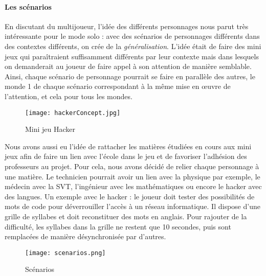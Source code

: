 \newpage
\paragraph{Les scénarios}En discutant du multijoueur, l'idée des différents personnages nous parut très intéressante pour le mode solo : avec des scénarios de personnages différents
dans des contextes différents, on crée de la \emph{généralisation}. L'idée était de faire des mini jeux qui paraîtraient suffisamment différents par leur contexte mais dans lesquels on
demanderait au joueur de faire appel à son attention de manière semblable. Ainsi, chaque scénario de personnage pourrait se faire en parallèle des autres, le monde 1 de chaque scénario
correspondant à la même mise en œuvre de l'attention, et cela pour tous les mondes. 

\begin{wrapfigure}[11]{l}{6cm}
    \vspace{-20pt}
    \begin{center}
    \texttt{[image: hackerConcept.jpg]}
    \end{center}
    \captionsetup{labelformat=simpleNumber}
    \caption{Mini jeu Hacker}
\label{Hacker}
\end{wrapfigure}

Nous avons aussi eu l'idée de rattacher les matières étudiées en cours aux mini jeux afin de faire un lien avec l'école dans le jeu et de favoriser l'adhésion des professeurs au projet.
Pour cela, nous avons décidé de relier chaque personnage à une matière. Le technicien pourrait avoir un lien avec la physique par exemple, le médecin avec la SVT, l'ingénieur avec les
mathématiques ou encore le hacker avec des langues. Un exemple avec le hacker : le joueur doit tester des possibilités de mots de code pour déverrouiller l'accès à un réseau
informatique. Il dispose d'une grille de syllabes et doit reconstituer des mots en anglais. Pour rajouter de la difficulté, les syllabes dans la grille ne restent que 10 secondes, puis
sont remplacées de manière désynchronisée par d'autres.

\begin{figure}[H]
    \begin{center}
    \texttt{[image: scenarios.png]}
    \end{center}
    \caption{Scénarios}
\label{Scenarios}
\end{figure}